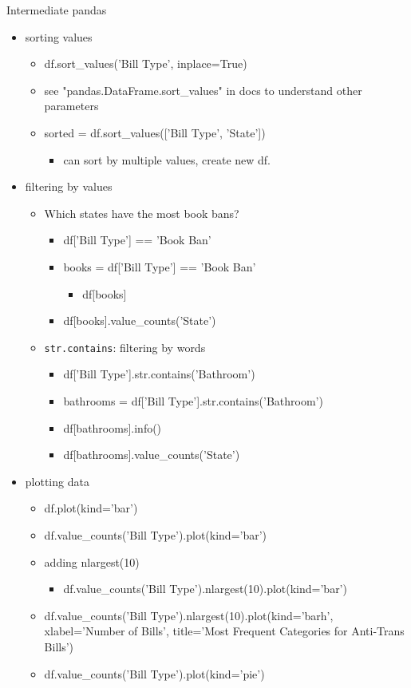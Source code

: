 \documentclass[11pt]{article}
\begin{document}
Intermediate pandas
\begin{itemize}
\item sorting values
\begin{itemize}
\item df.sort\_values('Bill Type', inplace=True)
\item see "pandas.DataFrame.sort\_values" in docs to understand other
parameters
\item sorted = df.sort\_values(['Bill Type', 'State'])
\begin{itemize}
\item can sort by multiple values, create new df.
\end{itemize}
\end{itemize}
\item filtering by values
\begin{itemize}
\item Which states have the most book bans?
\begin{itemize}
\item df['Bill Type'] == 'Book Ban'
\item books = df['Bill Type'] == 'Book Ban'
\begin{itemize}
\item df[books]
\end{itemize}
\item df[books].value\_counts('State')
\end{itemize}
\item \texttt{str.contains}: filtering by words 
\begin{itemize}
\item df['Bill Type'].str.contains('Bathroom')
\item bathrooms = df['Bill Type'].str.contains('Bathroom')
\item df[bathrooms].info()
\item df[bathrooms].value\_counts('State')
\end{itemize}
\end{itemize}

\item plotting data
\begin{itemize}
\item df.plot(kind='bar')

\item df.value\_counts('Bill Type').plot(kind='bar')

\item adding nlargest(10)

\begin{itemize}
\item df.value\_counts('Bill Type').nlargest(10).plot(kind='bar')
\end{itemize}

\item df.value\_counts('Bill Type').nlargest(10).plot(kind='barh',
xlabel='Number of Bills', title='Most Frequent Categories for
Anti-Trans Bills')

\item df.value\_counts('Bill Type').plot(kind='pie')
\end{itemize}
\end{itemize}
\end{document}

